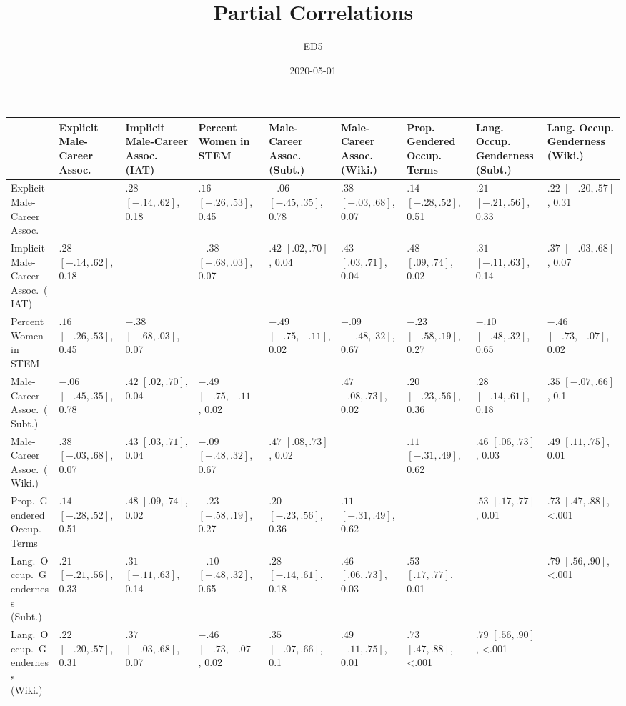 \documentclass[]{article}
\title{Partial Correlations}
\subtitle{ED5}
\author{}
\date{2020-05-01}
\begin{document}
\maketitle

\pagestyle{empty}
\hfill
\tiny
\begin{tabular}{lp{1.1cm}p{1.1cm}p{1.1cm}p{1.1cm}p{1.1cm}p{1.1cm}p{1.1cm}p{1.1cm}}
 & Explicit Male-Career Assoc. & Implicit Male-Career Assoc. (IAT) & Percent Women in STEM & Male-Career Assoc. (Subt.) & Male-Career Assoc. (Wiki.) & Prop. Gendered Occup. Terms & Lang. Occup. Genderness (Subt.) & Lang. Occup. Genderness (Wiki.)\\
\midrule
Explicit Male-Career Assoc. &  & $.28$ $[-.14,.62]$, 0.18 & $.16$ $[-.26,.53]$, 0.45 & $-.06$ $[-.45,.35]$, 0.78 & $.38$ $[-.03,.68]$, 0.07 & $.14$ $[-.28,.52]$, 0.51 & $.21$ $[-.21,.56]$, 0.33 & $.22$ $[-.20,.57]$, 0.31\\
\addlinespace
Implicit Male-Career Assoc.\ (IAT) & $.28$ $[-.14,.62]$, 0.18 &  & $-.38$ $[-.68,.03]$, 0.07 & $.42$ $[.02,.70]$, 0.04 & $.43$ $[.03,.71]$, 0.04 & $.48$ $[.09,.74]$, 0.02 & $.31$ $[-.11,.63]$, 0.14 & $.37$ $[-.03,.68]$, 0.07\\
\addlinespace
Percent Women in STEM & $.16$ $[-.26,.53]$, 0.45 & $-.38$ $[-.68,.03]$, 0.07 &  & $-.49$ $[-.75,-.11]$, 0.02 & $-.09$ $[-.48,.32]$, 0.67 & $-.23$ $[-.58,.19]$, 0.27 & $-.10$ $[-.48,.32]$, 0.65 & $-.46$ $[-.73,-.07]$, 0.02\\
\addlinespace
Male-Career Assoc.\ (Subt.) & $-.06$ $[-.45,.35]$, 0.78 & $.42$ $[.02,.70]$, 0.04 & $-.49$ $[-.75,-.11]$, 0.02 &  & $.47$ $[.08,.73]$, 0.02 & $.20$ $[-.23,.56]$, 0.36 & $.28$ $[-.14,.61]$, 0.18 & $.35$ $[-.07,.66]$, 0.1\\
\addlinespace
Male-Career Assoc.\ (Wiki.) & $.38$ $[-.03,.68]$, 0.07 & $.43$ $[.03,.71]$, 0.04 & $-.09$ $[-.48,.32]$, 0.67 & $.47$ $[.08,.73]$, 0.02 &  & $.11$ $[-.31,.49]$, 0.62 & $.46$ $[.06,.73]$, 0.03 & $.49$ $[.11,.75]$, 0.01\\
\addlinespace
Prop.\ Gendered Occup.\ Terms & $.14$ $[-.28,.52]$, 0.51 & $.48$ $[.09,.74]$, 0.02 & $-.23$ $[-.58,.19]$, 0.27 & $.20$ $[-.23,.56]$, 0.36 & $.11$ $[-.31,.49]$, 0.62 &  & $.53$ $[.17,.77]$, 0.01 & $.73$ $[.47,.88]$, <.001\\
\addlinespace

Lang.\ Occup.\ Genderness (Subt.) & $.21$ $[-.21,.56]$, 0.33 & $.31$ $[-.11,.63]$, 0.14 & $-.10$ $[-.48,.32]$, 0.65 & $.28$ $[-.14,.61]$, 0.18 & $.46$ $[.06,.73]$, 0.03 & $.53$ $[.17,.77]$, 0.01 &  & $.79$ $[.56,.90]$, <.001\\
\addlinespace

Lang.\ Occup.\ Genderness (Wiki.) & $.22$ $[-.20,.57]$, 0.31 & $.37$ $[-.03,.68]$, 0.07 & $-.46$ $[-.73,-.07]$, 0.02 & $.35$ $[-.07,.66]$, 0.1 & $.49$ $[.11,.75]$, 0.01 & $.73$ $[.47,.88]$, <.001 & $.79$ $[.56,.90]$, <.001 & \\
\bottomrule
\end{tabular}
\hfill
\null
\end{document}
